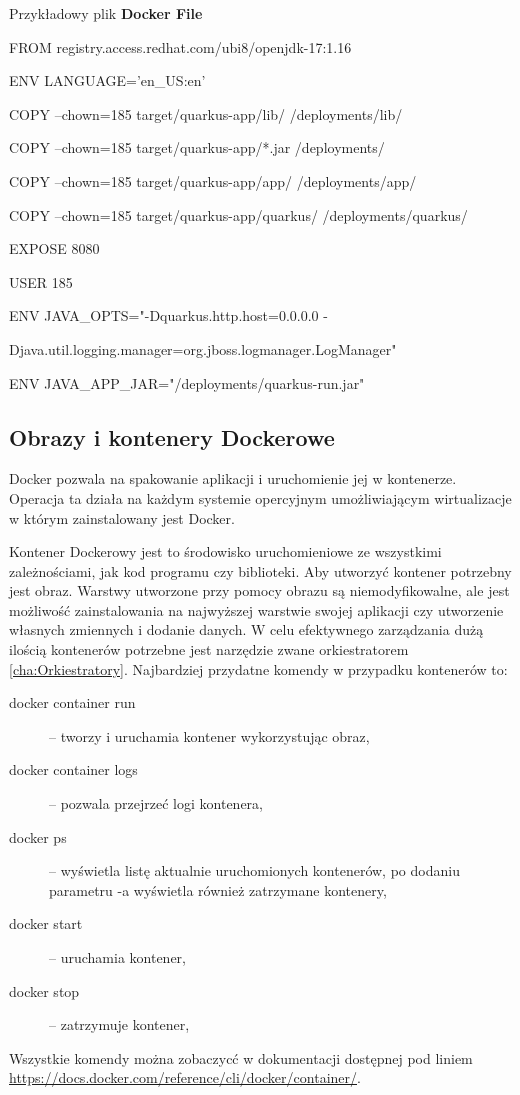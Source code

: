 \documentclass{iiuwb}
\begin{document}
Przykładowy plik \textbf{Docker File}\newline

FROM registry.access.redhat.com/ubi8/openjdk-17:1.16

ENV LANGUAGE='en\_US:en'

COPY --chown=185 target/quarkus-app/lib/ /deployments/lib/

COPY --chown=185 target/quarkus-app/*.jar /deployments/

COPY --chown=185 target/quarkus-app/app/ /deployments/app/

COPY --chown=185 target/quarkus-app/quarkus/ /deployments/quarkus/

EXPOSE 8080

USER 185

ENV JAVA\_OPTS="-Dquarkus.http.host=0.0.0.0 -

Djava.util.logging.manager=org.jboss.logmanager.LogManager"

ENV JAVA\_APP\_JAR="/deployments/quarkus-run.jar"


\subsection{Obrazy i kontenery Dockerowe}
\label{images and containers}

Docker pozwala na spakowanie aplikacji i uruchomienie jej w kontenerze. Operacja ta działa na każdym systemie opercyjnym umożliwiającym wirtualizacje w którym zainstalowany jest Docker.

Kontener Dockerowy jest to środowisko uruchomieniowe ze wszystkimi zależnościami, jak kod programu czy biblioteki. Aby utworzyć kontener potrzebny jest obraz. Warstwy utworzone przy pomocy obrazu są niemodyfikowalne, ale jest możliwość zainstalowania na najwyższej warstwie swojej aplikacji czy utworzenie własnych zmiennych i dodanie danych. W celu efektywnego zarządzania dużą ilością kontenerów potrzebne jest narzędzie zwane orkiestratorem \ref{cha:Orkiestratory}. 
\newline
Najbardziej przydatne komendy w przypadku kontenerów to:
\begin{description}
  \item[docker container run] -- tworzy i uruchamia kontener wykorzystując obraz,
  \item[docker container logs] -- pozwala przejrzeć logi kontenera,
  \item[docker ps] -- wyświetla listę aktualnie uruchomionych kontenerów, po dodaniu parametru -a wyświetla również zatrzymane kontenery,
  \item[docker start] -- uruchamia kontener,
  \item[docker stop] -- zatrzymuje kontener,
\end{description}
Wszystkie komendy można zobaczycć w dokumentacji dostępnej pod liniem \newline
\url{https://docs.docker.com/reference/cli/docker/container/}.
\newline
\end{document}
